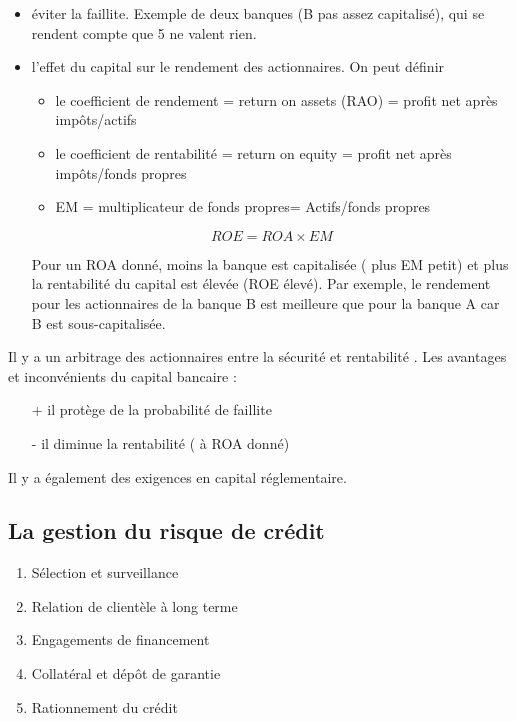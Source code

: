	\begin{itemize}
	
		\item éviter la faillite. Exemple de deux banques (B pas assez capitalisé), qui se rendent compte que 5 ne valent rien.
		

		\item l'effet du capital sur le rendement des actionnaires. On peut définir
		
		\begin{itemize}
			\item le coefficient de rendement = return on assets (RAO) = profit net après impôts/actifs 
			\item le coefficient de rentabilité = return on equity = profit net après impôts/fonds 
propres 
			\item EM = multiplicateur de fonds propres= Actifs/fonds propres 
		\end{itemize}
		
		$$ROE = ROA \times EM $$
		
		Pour un ROA donné, moins la banque est capitalisée ( plus EM petit) et plus la rentabilité du capital est élevée (ROE élevé). Par exemple, le rendement pour les actionnaires de la banque B est meilleure que pour la banque A car B est sous-capitalisée.
	\end{itemize}
	
	Il y a un arbitrage des actionnaires entre la sécurité et rentabilité . Les avantages et inconvénients du capital bancaire :
	\begin{itemize}
		\item[+] il protège de la probabilité de faillite 
		\item[-] il diminue la rentabilité ( à ROA donné) 
	\end{itemize}
		
	 Il y a également des exigences en capital réglementaire.
	
	
	\subsection{La gestion du risque de crédit}
	
	\begin{enumerate}	
		\item Sélection et surveillance 
		\item Relation de clientèle à long terme 
		\item Engagements de financement 
		\item Collatéral et dépôt de garantie 
		\item Rationnement du crédit
	\end{enumerate}
	

